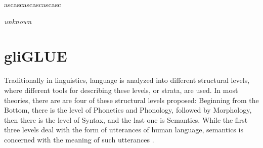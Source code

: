 \label{chap:3_datasets}

\epigraph{ascascascascascasc}{\textit{unknown}}

\section{gliGLUE}




Traditionally in linguistics, language is analyzed into different structural levels, where
different tools for describing these levels, or strata, are used.
In most theories, there are are four of these structural levels proposed:
Beginning from the Bottom, there is the level of Phonetics and Phonology, followed by Morphology,
then there is the level of Syntax, and the last one is Semantics.
While the first three levels deal with the form of utterances of human language, semantics is
concerned with the meaning of such utterances \citep[p.~4ff.]{kracht2007introduction}.



